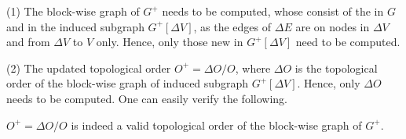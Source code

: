 

\sstab(1) The block-wise graph of $G^+$ needs to be computed, whose \sccs consist of the \sccs in $G$ and \sccs in the induced subgraph $G^+[\Delta V]$, as  the edges of $\Delta E$ are  on nodes in $\Delta V$ and from $\Delta V$  to $V$ only. Hence, only those new \sccs in $G^+[\Delta V]$ need to be computed.

\sstab(2) The updated topological order $O^+=\Delta O/O$, where $\Delta O$ is the topological order of the block-wise graph of induced subgraph $G^+[\Delta V]$. Hence, only $\Delta O$ needs to be computed. One can easily verify the following.


\begin{prop} \label{lemma-inc-topo}
 $O^+=\Delta O/O$ is indeed a valid topological order of the block-wise graph of $G^+$.
\end{prop}




